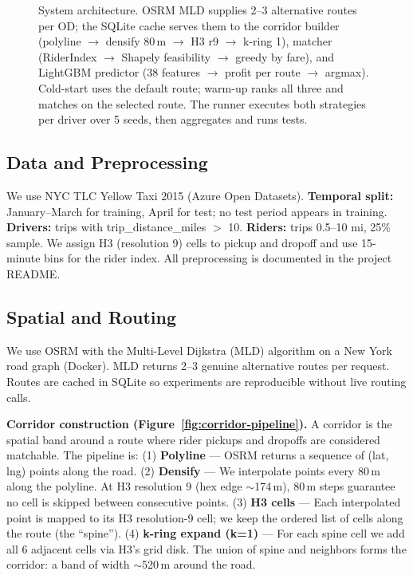 \documentclass[11pt,a4paper]{article}
\begin{document}
\begin{figure}[htbp]
{%
}
\caption{System architecture. OSRM MLD supplies 2--3 alternative routes per OD; the SQLite cache serves them to the corridor builder (polyline $\to$ densify 80\,m $\to$ H3 r9 $\to$ k-ring 1), matcher (RiderIndex $\to$ Shapely feasibility $\to$ greedy by fare), and LightGBM predictor (38 features $\to$ profit per route $\to$ argmax). Cold-start uses the default route; warm-up ranks all three and matches on the selected route. The runner executes both strategies per driver over 5 seeds, then aggregates and runs tests.}
\label{fig:architecture}
\end{figure}

\subsection{Data and Preprocessing}

We use NYC TLC Yellow Taxi 2015 (Azure Open Datasets). \textbf{Temporal split:} January--March for training, April for test; no test period appears in training. \textbf{Drivers:} trips with trip\_distance\_miles $>$ 10. \textbf{Riders:} trips 0.5--10 mi, 25\% sample. We assign H3 (resolution 9) cells to pickup and dropoff and use 15-minute bins for the rider index. All preprocessing is documented in the project README.

\subsection{Spatial and Routing}

We use OSRM with the Multi-Level Dijkstra (MLD) algorithm on a New York road graph (Docker). MLD returns 2--3 genuine alternative routes per request. Routes are cached in SQLite so experiments are reproducible without live routing calls.

\textbf{Corridor construction (Figure~\ref{fig:corridor-pipeline}).} A corridor is the spatial band around a route where rider pickups and dropoffs are considered matchable. The pipeline is: (1) \textbf{Polyline} --- OSRM returns a sequence of (lat, lng) points along the road. (2) \textbf{Densify} --- We interpolate points every 80\,m along the polyline. At H3 resolution 9 (hex edge $\sim$174\,m), 80\,m steps guarantee no cell is skipped between consecutive points. (3) \textbf{H3 cells} --- Each interpolated point is mapped to its H3 resolution-9 cell; we keep the ordered list of cells along the route (the ``spine''). (4) \textbf{k-ring expand (k=1)} --- For each spine cell we add all 6 adjacent cells via H3's grid disk. The union of spine and neighbors forms the corridor: a band of width $\sim$520\,m around the road.
\end{document}
